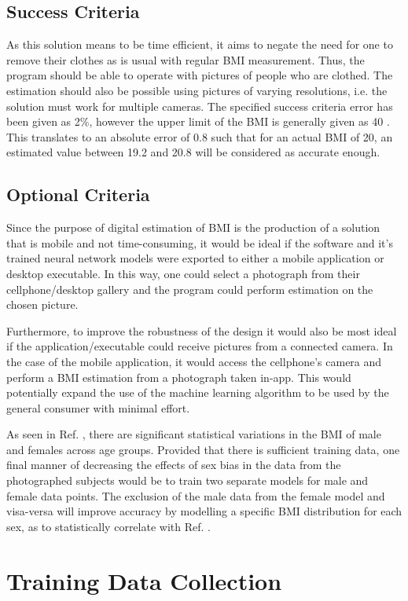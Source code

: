 \subsection{Success Criteria}
As this solution means to be time efficient, it aims to negate the need for one to remove their clothes as is usual with regular BMI measurement.
Thus, the program should be able to operate with pictures of people who are clothed.
The estimation should also be possible using pictures of varying resolutions, i.e. the solution must work for multiple cameras.
The specified success criteria error has been given as 2\%, however the upper limit of the BMI is generally given as 40 \cite{nhsBMI}. This translates to an absolute error of 0.8 such that for an actual BMI of 20, an estimated value between 19.2 and 20.8 will be considered as accurate enough.
\subsection{Optional Criteria}
Since the purpose of digital estimation of BMI is the production of a solution that is mobile and not time-consuming, it would be ideal if the software and it's trained neural network models were exported to either a mobile application or desktop executable.
In this way, one could select a photograph from their cellphone/desktop gallery and the program could perform estimation on the chosen picture.

Furthermore, to improve the robustness of the design it would also be most ideal if the application/executable could receive pictures from a connected camera.
In the case of the mobile application, it would access the cellphone's camera and perform a BMI estimation from a photograph taken in-app.
This would potentially expand the use of the machine learning algorithm to be used by the general consumer with minimal effort.

As seen in Ref. \cite{bmiage}, there are significant statistical variations in the BMI of male and females across age groups.
Provided that there is sufficient training data, one final manner of decreasing the effects of sex bias in the data from the photographed subjects would be to train two separate models for male and female data points.
The exclusion of the male data from the female model and visa-versa will improve accuracy by modelling a specific BMI distribution for each sex, as to statistically correlate with Ref. \cite{bmiage}.
\section{Training Data Collection}
